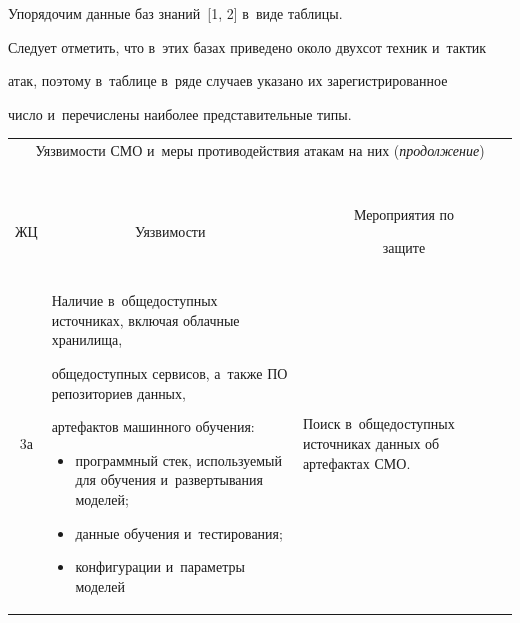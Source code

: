     Упорядочим данные баз знаний~[1, 2] в~виде таблицы. 

Следует отметить, что в~этих базах приведено около двухсот техник и~тактик 

атак, поэтому в~таб\-ли\-це в~ряде случаев указано их зарегистрированное 

число и~перечислены наиболее представительные типы.





\begin{table}\small  %

\label{s1}

\begin{center}

\tabcolsep=3pt

\begin{tabular}{|c|p{66mm}|p{50mm}|}

\multicolumn{3}{c}{Уязвимости СМО и~меры противодействия атакам на них (\textit{продолжение})}\\

\multicolumn{3}{c}{\ }\\[-6pt]

\hline

ЖЦ&\multicolumn{1}{c|}{Уязвимости}&\multicolumn{1}{c|}{Мероприятия по 

защите}\\

\hline

3а&Наличие в~общедоступных источниках, включая облачные хранилища, 

общедоступных сервисов, а~также ПО репозиториев данных, 

артефактов машинного обучения:\vspace*{-6pt}

\begin{itemize}

\addtolength{\itemsep}{-6pt}

\item программный стек, используемый для обучения и~развертывания моделей; 

\item данные обучения и~тестирования;

\item конфигурации и~параметры мо\-делей\vspace*{-6pt}

\end{itemize}&Поиск в~общедоступных источниках данных об артефактах СМО. \newline


\end{tabular}
\end{center}
\end{table}
